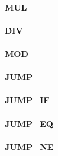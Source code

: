 \documentclass[12pt,a4paper]{article}
\begin{document}
\vspace{2em}\begin{minipage}{\textwidth}
\paragraph{MUL}
\end{minipage}

\vspace{2em}\begin{minipage}{\textwidth}
\paragraph{DIV}
\end{minipage}

\vspace{2em}\begin{minipage}{\textwidth}
\paragraph{MOD}
\end{minipage}

\vspace{2em}\begin{minipage}{\textwidth}
\paragraph{JUMP}
\end{minipage}

\vspace{2em}\begin{minipage}{\textwidth}
\paragraph{JUMP\_IF}
\end{minipage}

\vspace{2em}\begin{minipage}{\textwidth}
\paragraph{JUMP\_EQ}
\end{minipage}

\vspace{2em}\begin{minipage}{\textwidth}
\paragraph{JUMP\_NE}
\end{minipage}
\end{document}
